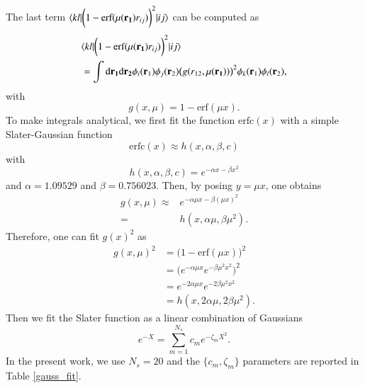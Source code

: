 \documentclass[aip,jcp,reprint,noshowkeys,superscriptaddress]{revtex4-1}
\newcommand{\matelem}[3]{\langle #1 | #2 | #3 \rangle}
\newcommand{\bri}[1]{{\bf r}_{#1}}
\newcommand{\dr}[1]{\text{d}{\bf r_{#1}}}
\newcommand{\mur}[1]{\mu({\bf r_{#1}})}
\begin{document}
The last term $\matelem{kl}{\bigg(1 -  \text{erf}(\mur{1} r_{ij}) \bigg)^2}{ij}$ can be computed as
\begin{equation}
 \label{eq:k_ijkl}
 \begin{aligned}
& \matelem{kl}{\bigg(1 -  \text{erf}(\mur{1} r_{ij}) \bigg)^2}{ij} \\ & = \int \dr{1} \dr{2} \phi_i(\bri{1}) \phi_j(\bri{2}) \big( g(r_{12},\mur{1}) \big)^2  \phi_k(\bri{1}) \phi_l(\bri{2}),  
 \end{aligned}
\end{equation}
with 
\begin{equation}
 g(x, \mu)= 1 - \text{erf}( \mu x).
\end{equation}
To make integrals analytical, we first fit the function $\text{erfc}(x)$ with a simple Slater-Gaussian function 
\begin{equation}
 \text{erfc}(x) \approx h(x,\alpha,\beta,c)
\end{equation}
with 
\begin{equation}
 h(x,\alpha,\beta,c) = e^{-\alpha x - \beta x^2}
\end{equation}
and $\alpha=1.09529$ and $\beta = 0.756023$. 
Then, by posing $y=\mu x$, one obtains 
\begin{equation}
 \label{fit_erf}
 \begin{aligned}
  g(x,\mu)  \approx & e^{-\alpha \mu x - \beta (\mu x)^2}\\ 
        =& h(x,\alpha \mu, \beta \mu^2).
 \end{aligned}
\end{equation}
Therefore, one can fit $g(x)^2$ as 
\begin{equation}
 \begin{aligned}
 g(x,\mu)^2&= \bigg( 1 - \text{erf}(\mu x) \bigg)^2\\
           &= \bigg( e^{-\alpha \mu x } e^{-\beta \mu^2 x^2}\bigg)^2 \\
           &= e^{-2\alpha  \mu x } e^{-2 \beta \mu^2 x^2} \\
           &= h(x,2 \alpha \mu, 2 \beta \mu^2).
 \end{aligned}
\end{equation}
Then we fit the Slater function as a linear combination of Gaussians 
\begin{equation}
 e^{-X} = \sum_{m=1}^{N_s} c_m e^{-\zeta_m X^2}. 
\end{equation}
In the present work, we use $N_s=20$ and the $\{c_m,\zeta_m\}$ parameters are reported in Table \ref{gauss_fit}.
\end{document}
